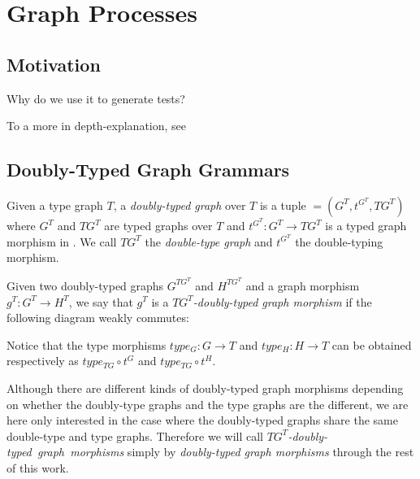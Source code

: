 \chapter{Graph Processes}

\section{Motivation}

Why do we use it to generate tests?

To a more in depth-explanation, see~\cite{Ribeiro1996, Corradini2014} 

\section{Doubly-Typed Graph Grammars}

\begin{definition} Given a type graph $T$, a \emph{doubly-typed graph} \doublyTypedGraph{} over $T$ is a tuple \doublyTypedGraph $= \left(G^T, t^{G^T},TG^T\right)$ where $G^T$ and $TG^T$ are typed graphs over $T$ and \mbox{$t^{G^T} : G^T \rightarrow TG^T$} is a typed graph morphism in \typedGraphCategory{}. We call $TG^T$ the \emph{double-type graph} and $t^{G^T}$ the double-typing morphism.

\end{definition}

\begin{definition}
  Given two doubly-typed graphs $G^{TG^T}$ and $H^{TG^T}$ and a graph morphism $g^T : G^T \rightarrow H^T$, we say that $g^T$ is a \emph{$TG^T$-doubly-typed graph morphism} if the following diagram weakly commutes:

\end{definition}

Notice that the type morphisms $type_G : G \rightarrow T$ and $type_H : H \rightarrow T$ can be obtained respectively as $type_{TG} \circ t^G$ and $type_{TG} \circ t^H$.

\begin{remark} Although there are different kinds of doubly-typed graph morphisms depending on whether the doubly-type graphs and the type graphs are the different, we are here only interested in the case where the doubly-typed graphs share the same double-type and type graphs. Therefore we will call \mbox{\emph{$TG^T$-doubly-typed graph morphisms}} simply by \emph{doubly-typed graph morphisms} through the rest of this work.

\end{remark}

